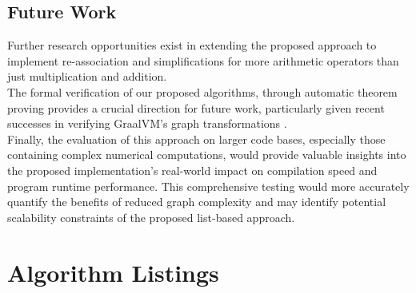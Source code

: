 \documentclass[12pt,openany,a4paper]{book}
\begin{document}
\section{Future Work}
\label{futurework}

Further research opportunities exist in extending the proposed approach to 
implement re-association and simplifications for more arithmetic operators
than just multiplication and addition. \\
The formal verification of our proposed algorithms, through automatic theorem proving
provides a crucial direction for future work, particularly given recent
successes in verifying GraalVM's graph transformations \cite{vtgo}. \\
Finally, the evaluation of this approach on larger code bases, especially those
containing complex numerical computations, would provide valuable insights
into the proposed implementation's real-world impact on compilation speed and
program runtime performance. This comprehensive testing would more
accurately quantify the benefits of reduced graph complexity and may
identify potential scalability constraints of the proposed list-based approach.

% 
% 

\appendix


\newpage
{}
\mbox{}
\newpage


\chapter{Algorithm Listings}
\label{appendixalgo}
\end{document}
